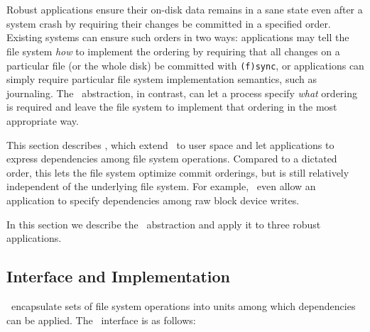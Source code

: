\section{\Opgroups}
\label{sec:opgroup}

\newcommand{\pgCreate}{\texttt{pg\_create}}
\newcommand{\pgDepend}{\texttt{pg\_depend}}
\newcommand{\pgEngage}{\texttt{pg\_engage}}
\newcommand{\pgDisengage}{\texttt{pg\_disengage}}
\newcommand{\pgRelease}{\texttt{pg\_release}}
\newcommand{\pgSync}{\texttt{pg\_sync}}
\newcommand{\pgClose}{\texttt{pg\_close}}

Robust applications
%
ensure their on-disk data remains in a sane state even after a
system crash by requiring their changes be committed in
a specified order.
%
Existing systems can ensure such orders in two ways:
%
applications may tell the file system \emph{how} to implement the ordering
by requiring that all changes on a particular file (or the whole disk) be
committed with \texttt{(f)sync}, or applications can simply require
particular file system implementation semantics, such as journaling.
%
%
The \chdesc\ abstraction, in contrast, can let a process specify
\emph{what} ordering is required and leave the file system to implement
that ordering in the most appropriate way.


This section describes \emph{\opgroups}, which extend \chdescs\ to user
space and let applications to express dependencies among file system
operations.
%
Compared to a dictated order, this lets the file system optimize commit
orderings, but is still relatively independent of the underlying file
system.
%
For example, \opgroups\ even allow an application to specify
dependencies among raw block device writes.

In this section we describe the \opgroup\ abstraction
%
and apply it to three robust applications.


\subsection{Interface and Implementation}
\label{sec:opgroup:interface}

\Opgroups\ encapsulate sets of file system operations into units among
which dependencies can be applied.
%
%
The \opgroup\ interface is as follows:

